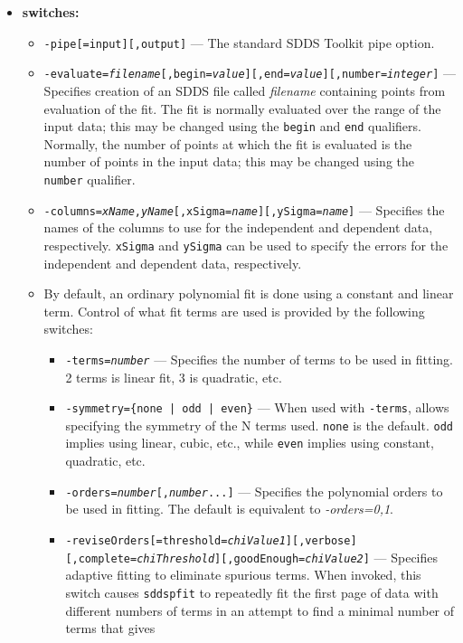 \begin{itemize}
\item {\bf switches:}
    \begin{itemize}
    \item {\tt -pipe[=input][,output]} --- The standard SDDS Toolkit pipe option.
    \item {\tt -evaluate={\em filename}[,begin={\em value}][,end={\em value}][,number={\em integer}]} ---
        Specifies creation of an SDDS file called {\em filename} containing points from evaluation of the
        fit.  The fit is normally evaluated over the range of the input data; this may be changed using
        the {\tt begin} and {\tt end} qualifiers.  Normally, the number of points at which the fit is
        evaluated is the number of points in the input data; this may be changed using the {\tt number}
        qualifier.
    \item {\tt -columns={\em xName},{\em yName}[,xSigma={\em name}][,ySigma={\em name}]} --- Specifies
        the names of the columns to use for the independent and dependent data, respectively.
        {\tt xSigma} and {\tt ySigma} can be used to specify the errors for the independent and dependent
        data, respectively.
    \item By default, an ordinary polynomial fit is done using a constant and linear term.  Control of what fit terms are used is
        provided by the following switches:
        \begin{itemize}
        \item {\tt -terms={\em number}} --- Specifies the number of terms to be used in fitting. 2 terms is
         linear fit, 3 is quadratic, etc.
        \item {\tt -symmetry=\{none | odd | even\}} --- When used with {\tt -terms}, allows specifying the
        symmetry of the N terms used.  {\tt none} is the default.  {\tt odd} implies using linear, cubic, etc.,
        while  {\tt even} implies using constant, quadratic, etc.
        \item {\tt -orders={\em number}[,{\em number}...]} --- Specifies the polynomial orders to be used in
        fitting.  The default is equivalent to {\em -orders=0,1}.
        \item {\tt -reviseOrders[=threshold={\em chiValue1}][,verbose]}
        {\tt [,complete={\em chiThreshold}][,goodEnough={\em chiValue2}]} ---
        Specifies adaptive fitting to eliminate spurious terms.     
        When invoked, this switch causes {\tt sddspfit} to repeatedly fit the first page of data 
        with different numbers of terms in an attempt to find a minimal number of terms that gives

\end{itemize}
\end{itemize}
\end{itemize}
